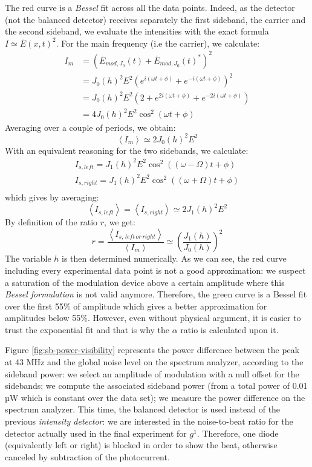 \documentclass[11pt]{report}
\begin{document}
The red curve is a \textit{Bessel} fit across all the data points. Indeed, as the detector (not the balanced detector) receives separately the first sideband, the carrier and the second sideband, we evaluate the intensities with the exact formula $I \simeq \overline{E}(x,t)^2$. For the main frequency (i.e the carrier), we calculate:
\begin{align}
I_m &= \left( \overline{E}_{mod,J_0}(t) + \overline{E}_{mod,J_0}(t)^* \right)^2\\
&= J_0(h)^2E^2\left(e^{i(\omega t + \phi)} + e^{-i(\omega t + \phi)}\right)^2\\
&= J_0(h)^2E^2\left( 2 + e^{2i(\omega t + \phi)} + e^{-2i(\omega t + \phi)}\right)\\
&= 4J_0(h)^2E^2\cos^2(\omega t + \phi)
\end{align}
Averaging over a couple of periods, we obtain:
\begin{equation}
\left\langle I_m \right\rangle \simeq 2J_0(h)^2E^2
\end{equation}
With an equivalent reasoning for the two sidebands, we calculate:
\begin{align}
I_{s,left} = J_1(h)^2E^2\cos^2(( \omega - \Omega ) t + \phi )\\
I_{s,right} = J_1(h)^2E^2\cos^2(( \omega + \Omega ) t + \phi )\\
\end{align}
which gives by averaging:
\begin{equation}
\left\langle I_{s,left} \right\rangle = \left\langle I_{s,right} \right\rangle \simeq 2J_1(h)^2E^2
\end{equation}
By definition of the ratio $r$, we get:
\begin{equation}
r = \frac{\left\langle I_{s,\, left \, or \, right} \right\rangle}{\left\langle I_m \right\rangle} \simeq \left( \frac{J_1(h)}{J_0(h)} \right)^2
\end{equation}
The variable $h$ is then determined numerically. As we can see, the red curve including every experimental data point is not a good approximation: we suspect a saturation of the modulation device above a certain amplitude where this \textit{Bessel formulation} is not valid anymore. Therefore, the green curve is a Bessel fit over the first 55\% of amplitude which gives a better approximation for amplitudes below 55\%. However, even without physical argument, it is easier to trust the exponential fit and that is why the $\alpha$ ratio is calculated upon it.

Figure \ref{fig:sb-power-visibility} represents the power difference between the peak at 43 MHz and the global noise level on the spectrum analyzer, according to the sideband power: we select an amplitude of modulation with a null offset for the sidebands; we compute the associated sideband power (from a total power of 0.01 µW which is constant over the data set); we measure the power difference on the spectrum analyzer. This time, the balanced detector is used instead of the previous \textit{intensity detector}: we are interested in the noise-to-beat ratio for the detector actually used in the final experiment for $g^1$. Therefore, one diode (equivalently left or right) is blocked in order to show the beat, otherwise canceled by subtraction of the photocurrent.
\end{document}
